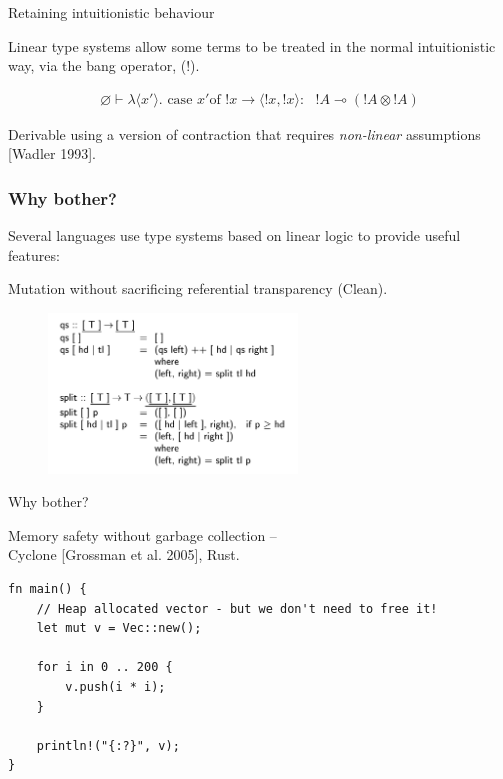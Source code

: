 \documentclass[10pt]{beamer}
\let\emptyset\varnothing
\newcommand{\case}{\text{ case }}
\newcommand{\of}{\text{of }}
\newcommand{\yields}{\multimap}
\begin{document}
\begin{frame}{Retaining intuitionistic behaviour}

Linear type systems allow some terms to be treated in the normal intuitionistic way, via the bang operator, (!).

\begin{eqnarray*}
\emptyset \vdash \lambda \langle x' \rangle . \case x' \of !x \rightarrow \langle !x, !x \rangle :\text{ } !A \yields (!A \otimes !A)
\end{eqnarray*}

Derivable using a version of contraction that requires \textit{non-linear} assumptions [Wadler 1993].

\end{frame}

\begin{frame}

\frametitle{Why bother?}

Several languages use type systems based on linear logic to provide useful features:

Mutation without sacrificing referential transparency (Clean).

\begin{figure}[h]
\centering
\includegraphics[width=250px]{Clean_Quicksort.png}
\label{}
\end{figure}
\end{frame}

\begin{frame}[fragile]{Why bother?}

Memory safety without garbage collection --\\
	Cyclone [Grossman et al. 2005], Rust.

\begin{verbatim}
fn main() {
    // Heap allocated vector - but we don't need to free it!
    let mut v = Vec::new();

    for i in 0 .. 200 {
        v.push(i * i);
    }

    println!("{:?}", v);
}
\end{verbatim}

\end{frame}
\end{document}
